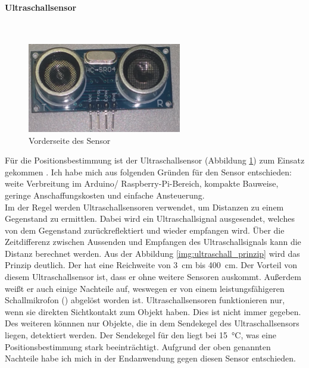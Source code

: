 \paragraph{Ultraschallsensor}\mbox{}\\

\begin{figure}[!ht]
        \centering
        \includegraphics[width=0.6\textwidth]{images/ultraschallsensor.png}
        \caption{Vorderseite des \ultraschall \platz Sensor}
        \label{img:ultraschallsensor}
\end{figure}

Für die Positionsbestimmung ist der Ultraschallsensor \ultraschall \platz (Abbildung \ref{img:ultraschallsensor}) zum Einsatz gekommen \cite{src_HC_SR04}. Ich habe mich aus folgenden Gründen für den \ultraschall \platz Sensor entschieden: weite Verbreitung im Arduino/ Raspberry-Pi-Bereich, kompakte Bauweise, geringe Anschaffungskosten und einfache Ansteuerung.
\\
Im der Regel werden Ultraschallsensoren verwendet, um Distanzen zu einem Gegenstand zu ermittlen. Dabei wird ein Ultraschallsignal ausgesendet, welches von dem Gegenstand zurückreflektiert und wieder empfangen wird. Über die Zeitdifferenz zwischen Aussenden und Empfangen des Ultraschallsignals kann die Distanz berechnet werden. Aus der Abbildung \ref{img:ultraschall_prinzip} wird das Prinzip deutlich. Der \ultraschall \platz  hat eine Reichweite von \SI{3}{\centi \metre} bis \SI{400}{\centi \metre}. Der Vorteil von diesem Ultraschallsensor ist, dass er ohne weitere Sensoren auskommt. Außerdem weißt er auch einige Nachteile auf, weswegen er von einem leistungsfähigeren Schallmikrofon (\microphone) abgelöst worden ist. Ultraschallsensoren funktionieren nur, wenn sie direkten Sichtkontakt zum Objekt haben. Dies ist nicht immer gegeben. Des weiteren könnnen nur Objekte, die in dem Sendekegel des Ultraschallsensors liegen, detektiert werden. Der Sendekegel für den \ultraschall \platz liegt bei \SI{15}{\degreeCelsius}, was eine Positionsbestimmung stark beeinträchtigt. Aufgrund der oben genannten Nachteile habe ich mich in der Endanwendung gegen diesen Sensor entschieden.

